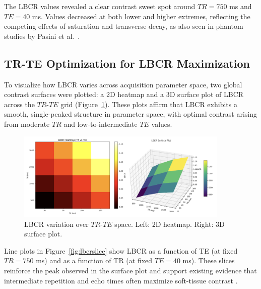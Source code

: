 \documentclass[10pt,a4paper,twoside]{article}
\begin{document}
\begin{enumerate}
The LBCR values revealed a clear contrast sweet spot around \( TR = 750 \) ms and \( TE = 40 \) ms. Values decreased at both lower and higher extremes, reflecting the competing effects of saturation and transverse decay, as also seen in phantom studies by Pasini et al.\ \cite{pasini2025}.

\subsection{TR-TE Optimization for LBCR Maximization}

To visualize how LBCR varies across acquisition parameter space, two global contrast surfaces were plotted: a 2D heatmap and a 3D surface plot of LBCR across the \( TR \)-\( TE \) grid (Figure~\ref{fig:lbcrsurface}). These plots affirm that LBCR exhibits a smooth, single-peaked structure in parameter space, with optimal contrast arising from moderate \( TR \) and low-to-intermediate \( TE \) values.

\begin{figure}[htbp!]
\centering
\includegraphics[width=0.9\textwidth]{lbcrsurfaceheatmap.png}
\caption{LBCR variation over \( TR \)-\( TE \) space. Left: 2D heatmap. Right: 3D surface plot.}
\label{fig:lbcrsurface}
\end{figure}

Line plots in Figure~\ref{fig:lbcrslice} show LBCR as a function of TE (at fixed \( TR = 750 \) ms) and as a function of TR (at fixed \( TE = 40 \) ms). These slices reinforce the peak observed in the surface plot and support existing evidence that intermediate repetition and echo times often maximize soft-tissue contrast \cite{naganawa2002, bernstein2004}.


\end{enumerate}
\end{document}
